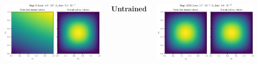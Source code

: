 \documentclass[a0paper]{tikzposter}
\begin{document}
\begin{columns}
{    \vspace{1.5ex}

    \begin{minipage}{0.33\linewidth}
      \centering
      \includegraphics[scale=2.25,trim={0.9cm 0.8cm 6.7cm 1cm}, clip]{../kfac_pinns_exp/exp42_visualize_solutions/visualize_solution/SGD/poisson_2d_sin_product_mlp-tanh-64_SGD_step0000000.pdf}

      \textbf{Untrained}
    \end{minipage}
    \hfill
    \begin{minipage}{0.33\linewidth}
      \centering
      \includegraphics[scale=2.25,trim={0.9cm 0.8cm 6.7cm 1cm}, clip]{../kfac_pinns_exp/exp42_visualize_solutions/visualize_solution/SGD/poisson_2d_sin_product_mlp-tanh-64_SGD_step0003299.pdf}


\end{minipage}}
\end{columns}
\end{document}
